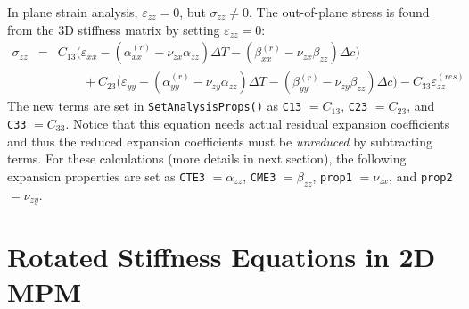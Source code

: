 \documentclass[11pt]{book}
\def\a#1{\alpha_{#1}}
\def\b#1{\beta_{#1}}
\def\code#1{{\small\tt #1}}
\def\DT{\Delta T}
\def\e#1{\varepsilon_{#1}}
\def\er#1{\varepsilon_{#1}^{(res)}}
\def\s#1{\sigma_{#1}}
\def\v#1{\nu_{#1}}
\begin{document}
In plane strain analysis, $\e{zz}=0$, but $\s{zz}\ne0$. The out-of-plane stress is found from the 3D stiffness matrix by setting $\e{zz}=0$:
\begin{eqnarray}
            \s{zz} & = & C_{13}\bigl(\e{xx} -(\a{xx}^{(r)}-\v{zx}\a{zz})\DT - (\b{xx}^{(r)}-\v{zx}\b{zz})\Delta c\bigr)
 \nonumber\\
 &&\qquad\mbox{}
                     +C_{23}\bigl(\e{yy} -(\a{yy}^{(r)}-\v{zy}\a{zz})\DT-(\b{yy}^{(r)}-\v{zy}\b{zz})\Delta c\bigr) 
                     -C_{33} \er{zz}
\end{eqnarray}
The new terms are set in \code{SetAnalysisProps()} as \code{C13} $=C_{13}$, \code{C23} $=C_{23}$, and \code{C33} $=C_{33}$. Notice that this equation needs actual residual expansion coefficients and thus the reduced expansion coefficients must be {\em unreduced} by subtracting terms. For these calculations (more details in next section), the following expansion properties are set as \code{CTE3} $=\a{zz}$, \code{CME3} $=\b{zz}$, \code{prop1} $=\v{zx}$, and \code{prop2} $=\v{zy}$.

\section{Rotated Stiffness Equations in 2D MPM}
\end{document}
